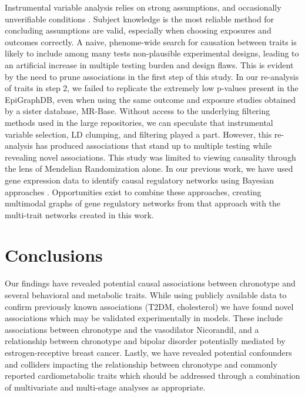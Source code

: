 \documentclass[journal,article,submit,moreauthors,pdftex]{Definitions/mdpi}
\begin{document}
Instrumental variable analysis relies on strong assumptions, and occasionally unverifiable conditions \cite{labrecque_understanding_2018}. Subject knowledge is the most reliable method for concluding assumptions are valid, especially when choosing exposures and outcomes correctly. A naive, phenome-wide search for causation between traits is likely to include among many tests non-plausible experimental designs, leading to an artificial increase in multiple testing burden and design flaws. This is evident by the need to prune associations in the first step of this study. In our re-analysis of traits in step 2, we failed to replicate the extremely low p-values present in the EpiGraphDB, even when using the same outcome and exposure studies obtained by a sister database, MR-Base. Without access to the underlying filtering methods used in the large repositories, we can speculate that instrumental variable selection, LD clumping, and filtering played a part. However, this re-analysis has produced associations that stand up to multiple testing while revealing novel associations. This study was limited to viewing causality through the lens of Mendelian Randomization alone. In our previous work, we have used gene expression data to identify causal regulatory networks using Bayesian approaches \cite{Aziz_2020}. Opportunities exist to combine these approaches, creating multimodal graphs of gene regulatory networks from that approach with the multi-trait networks created in this work. 

\section{Conclusions}
Our findings have revealed potential causal associations between chronotype and several behavioral and metabolic traits. While using publicly available data to confirm previously known associations (T2DM, cholesterol) we have found novel associations which may be validated experimentally in models. These include associations between chronotype and the vasodilator Nicorandil, and a relationship between chronotype and bipolar disorder potentially mediated by estrogen-receptive breast cancer. Lastly, we have revealed potential confounders and colliders impacting the relationship between chronotype and commonly reported cardiometabolic traits which should be addressed through a combination of multivariate and multi-stage analyses as appropriate.
\end{document}
